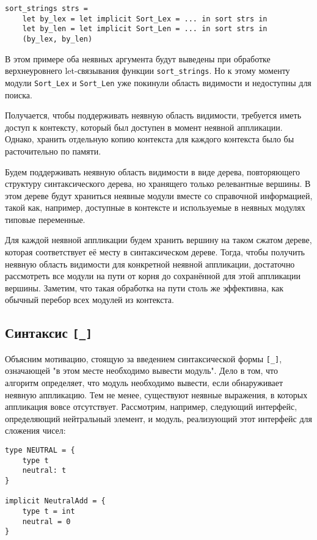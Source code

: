 \documentclass[../diploma.tex]{subfiles}
\begin{document}
\begin{verbatim}
sort_strings strs = 
    let by_lex = let implicit Sort_Lex = ... in sort strs in
    let by_len = let implicit Sort_Len = ... in sort strs in
    (by_lex, by_len)
\end{verbatim}

В этом примере оба неявных аргумента будут выведены при обработке верхнеуровнего let-связывания функции \texttt{sort_strings}. Но к этому моменту модули \texttt{Sort_Lex} и \texttt{Sort_Len} уже покинули область видимости и недоступны для поиска.

Получается, чтобы поддерживать неявную область видимости, требуется иметь доступ к контексту, который был доступен в момент неявной аппликации. Однако, хранить отдельную копию контекста для каждого контекста было бы расточительно по памяти. 

Будем поддерживать неявную область видимости в виде дерева, повторяющего структуру синтаксического дерева, но хранящего только релевантные вершины. В этом дереве будут храниться неявные модули вместе со справочной информацией, такой как, например, доступные в контексте и используемые в неявных модулях типовые переменные. 

Для каждой неявной аппликации будем хранить вершину на таком сжатом дереве, которая соответствует её месту в синтаксическом дереве. Тогда, чтобы получить неявную область видимости для конкретной неявной аппликации, достаточно рассмотреть все модули на пути от корня до сохранённой для этой аппликации вершины. Заметим, что такая обработка на пути столь же эффективна, как обычный перебор всех модулей из контекста. 

\subsection{Синтаксис \texttt{[\_]}}

Объясним мотивацию, стоящую за введением синтаксической формы \texttt{[\_]}, означающей "в этом месте необходимо вывести модуль". Дело в том, что алгоритм определяет, что модуль необходимо вывести, если обнаруживает неявную аппликацию. Тем не менее, существуют неявные выражения, в которых аппликация вовсе отсутствует. Рассмотрим, например, следующий интерфейс, определяющий нейтральный элемент, и модуль, реализующий этот интерфейс для сложения чисел:

\begin{verbatim}
type NEUTRAL = {
    type t
    neutral: t
}

implicit NeutralAdd = {
    type t = int
    neutral = 0
}
\end{verbatim}
\end{document}
